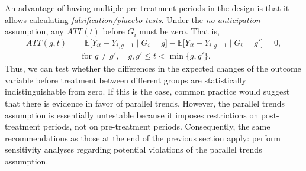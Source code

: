 %
%

An advantage of having multiple pre-treatment periods in the design is that it allows calculating \textit{falsification/placebo tests}. Under the \textit{no anticipation} assumption, any $ATT(t)$ before $G_i$ must be zero. That is, 
\begin{align*}
	ATT(g,t) 
	&= \mathbb{E}\big[ Y_{it} - Y_{i, g-1} \mid G_i = g \big]
	- \mathbb{E}\big[ Y_{it} - Y_{i, g-1} \mid G_i = g' \big] = 0, \\
	&\quad \text{for } g \neq g', \quad g, g' \leq t < \min\{g, g'\}.
\end{align*}
Thus, we can test whether the differences in the expected changes of the outcome variable before treatment between different groups are statistically indistinguishable from zero. If this is the case, common practice would suggest that there is evidence in favor of parallel trends. However, the parallel trends assumption is essentially untestable because it imposes restrictions on post-treatment periods, not on pre-treatment periods. Consequently, the same recommendations as those at the end of the previous section apply: perform sensitivity analyses regarding potential violations of the parallel trends assumption.

